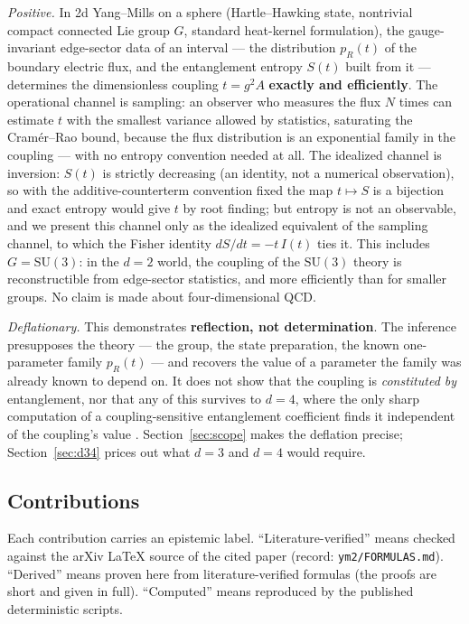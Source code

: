 \documentclass[11pt]{article}
\theoremstyle{remark}
\theoremstyle{plain}
\begin{document}
\emph{Positive.} In 2d Yang--Mills on a sphere (Hartle--Hawking state, nontrivial compact connected Lie group $G$, standard heat-kernel formulation), the gauge-invariant edge-sector data of an interval --- the distribution $p_R(t)$ of the boundary electric flux, and the entanglement entropy $S(t)$ built from it --- determines the dimensionless coupling $t = g^2 A$ \textbf{exactly and efficiently}. The operational channel is sampling: an observer who measures the flux $N$ times can estimate $t$ with the smallest variance allowed by statistics, saturating the Cram\'er--Rao bound, because the flux distribution is an exponential family in the coupling --- with no entropy convention needed at all. The idealized channel is inversion: $S(t)$ is strictly decreasing (an identity, not a numerical observation), so with the additive-counterterm convention fixed the map $t \mapsto S$ is a bijection and exact entropy would give $t$ by root finding; but entropy is not an observable, and we present this channel only as the idealized equivalent of the sampling channel, to which the Fisher identity $dS/dt = -t\,I(t)$ ties it. This includes $G = \mathrm{SU}(3)$: in the $d = 2$ world, the coupling of the $\mathrm{SU}(3)$ theory is reconstructible from edge-sector statistics, and more efficiently than for smaller groups. No claim is made about four-dimensional QCD.

\emph{Deflationary.} This demonstrates \textbf{reflection, not determination}. The inference presupposes the theory --- the group, the state preparation, the known one-parameter family $p_R(t)$ --- and recovers the value of a parameter the family was already known to depend on. It does not show that the coupling is \emph{constituted by} entanglement, nor that any of this survives to $d = 4$, where the only sharp computation of a coupling-sensitive entanglement coefficient finds it independent of the coupling's value \cite{CHMP}. Section~\ref{sec:scope} makes the deflation precise; Section~\ref{sec:d34} prices out what $d = 3$ and $d = 4$ would require.

\subsection{Contributions}

Each contribution carries an epistemic label. ``Literature-verified'' means checked against the arXiv LaTeX source of the cited paper (record: \texttt{ym2/FORMULAS.md}). ``Derived'' means proven here from literature-verified formulas (the proofs are short and given in full). ``Computed'' means reproduced by the published deterministic scripts.
\end{document}
